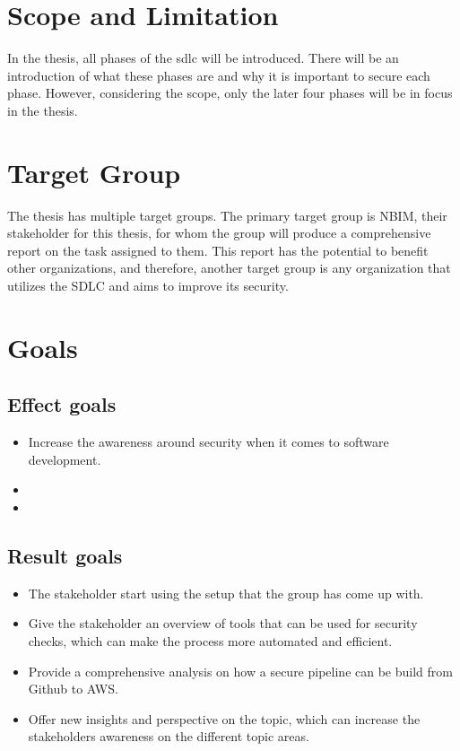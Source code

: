  
\section{Scope and Limitation}
In the thesis, all phases of the \acrlong{sdlc} will be introduced. There will be an introduction of what these phases are and why it is important to secure each phase. However, considering the scope, only the later four phases will be in focus in the thesis. 


\section{Target Group}
The thesis has multiple target groups. The primary target group is NBIM, their stakeholder for this thesis, for whom the group will produce a comprehensive report on the task assigned to them. This report has the potential to benefit other organizations, and therefore, another target group is any organization that utilizes the SDLC and aims to improve its security.

\section{Goals}
\subsection{Effect goals}
\begin{itemize}
    \item Increase the awareness around security when it comes to software development. 
    \item 
    \item 
\end{itemize}
\subsection{Result goals}
\begin{itemize}
    \item The stakeholder start using the setup that the group has come up with. 
    \item Give the stakeholder an overview of tools that can be used for security checks, which can make the process more automated and efficient. 
    \item Provide a comprehensive analysis on how a secure pipeline can be build from Github to AWS. 
    \item Offer new insights and perspective on the topic, which can increase the stakeholders awareness on the different topic areas. 
    
\end{itemize}
